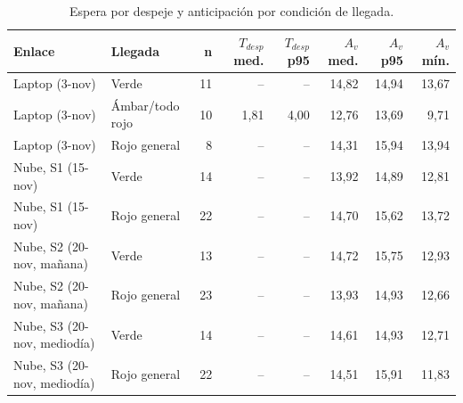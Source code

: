 \begin{table}[H]
\centering
\caption{Espera por despeje y anticipación por condición de llegada.}
\label{tab:latencia_por_condicion}
\small
\begin{tabular}{llrrrrrr}
\toprule
\textbf{Enlace} & \textbf{Llegada} & \textbf{n} & \textbf{$T_{desp}$ med.} & \textbf{$T_{desp}$ p95} & \textbf{$A_v$ med.} & \textbf{$A_v$ p95} & \textbf{$A_v$ mín.} \\
\midrule
Laptop (3-nov) & Verde & 11 & -- & -- & 14,82 & 14,94 & 13,67 \\
Laptop (3-nov) & Ámbar/todo rojo & 10 & 1,81 & 4,00 & 12,76 & 13,69 & 9,71 \\
Laptop (3-nov) & Rojo general & 8 & -- & -- & 14,31 & 15,94 & 13,94 \\
\addlinespace
Nube, S1 (15-nov) & Verde & 14 & -- & -- & 13,92 & 14,89 & 12,81 \\
Nube, S1 (15-nov) & Rojo general & 22 & -- & -- & 14,70 & 15,62 & 13,72 \\
\addlinespace
Nube, S2 (20-nov, mañana) & Verde & 13 & -- & -- & 14,72 & 15,75 & 12,93 \\
Nube, S2 (20-nov, mañana) & Rojo general & 23 & -- & -- & 13,93 & 14,93 & 12,66 \\
\addlinespace
Nube, S3 (20-nov, mediodía) & Verde & 14 & -- & -- & 14,61 & 14,93 & 12,71 \\
Nube, S3 (20-nov, mediodía) & Rojo general & 22 & -- & -- & 14,51 & 15,91 & 11,83 \\
\bottomrule
\end{tabular}
\par{}
\end{table}
